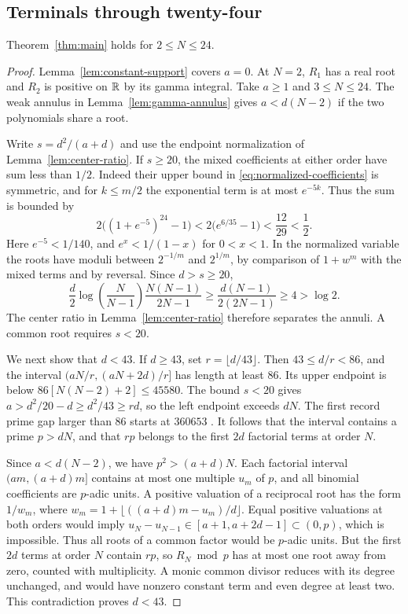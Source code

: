\subsection{Terminals through twenty-four}

\begin{proposition}
\label{prop:small-terminals}
Theorem~\ref{thm:main} holds for \(2\le N\le24\).
\end{proposition}
\begin{proof}
Lemma~\ref{lem:constant-support} covers \(a=0\). At \(N=2\), \(R_1\)
has a real root and \(R_2\) is positive on \(\mathbb R\) by its gamma integral.
Take \(a\ge1\) and \(3\le N\le24\). The weak annulus in
Lemma~\ref{lem:gamma-annulus} gives \(a<d(N-2)\) if the two polynomials
share a root.

Write \(s=d^2/(a+d)\) and use the endpoint normalization
of Lemma~\ref{lem:center-ratio}. If \(s\ge20\), the mixed
coefficients at either order have sum less than \(1/2\).
Indeed their upper bound in \eqref{eq:normalized-coefficients}
is symmetric, and for \(k\le m/2\) the exponential term is
at most \(e^{-5k}\). Thus the sum is bounded by
\[
 2\bigl((1+e^{-5})^{24}-1\bigr)
 <2\bigl(e^{6/35}-1\bigr)<\frac{12}{29}<\frac12.
\]
Here \(e^{-5}<1/140\), and \(e^x<1/(1-x)\) for \(0<x<1\).
In the normalized variable the roots have moduli between
\(2^{-1/m}\) and \(2^{1/m}\), by comparison of \(1+w^m\)
with the mixed terms and by reversal. Since \(d>s\ge20\),
\[
 \frac d2\log\!\left(\frac{N}{N-1}\right)
 \frac{N(N-1)}{2N-1}
 \ge \frac{d(N-1)}{2(2N-1)}\ge 4>\log 2 .
\]
The center ratio in Lemma~\ref{lem:center-ratio} therefore
separates the annuli. A common root requires \(s<20\).

We next show that \(d<43\). If \(d\ge43\), set
\(r=\lfloor d/43\rfloor\). Then \(43\le d/r<86\), and the interval
\((aN/r,(aN+2d)/r]\) has length at least \(86\). Its upper endpoint
is below \(86[N(N-2)+2]\le45580\).
The bound \(s<20\) gives \(a>d^2/20-d\ge d^2/43\ge rd\), so the
left endpoint exceeds \(dN\). The first record prime gap larger
than \(86\) starts at \(360653\) \cite[Table~8]{oliveira-gaps}.
It follows that the interval contains a prime \(p>dN\), and that
\(rp\) belongs to the first \(2d\) factorial terms at order \(N\).

Since \(a<d(N-2)\), we have \(p^2>(a+d)N\).
Each factorial interval \((am,(a+d)m]\) contains at most one
multiple \(u_m\) of \(p\), and all binomial coefficients are
\(p\)-adic units. A positive valuation of a reciprocal root
has the form \(1/w_m\), where
\(w_m=1+\lfloor((a+d)m-u_m)/d\rfloor\).
Equal positive valuations at both orders would imply
\(u_N-u_{N-1}\in[a+1,a+2d-1]\subset(0,p)\), which is impossible.
Thus all roots of a common factor would be \(p\)-adic units.
But the first \(2d\) terms at order \(N\) contain \(rp\), so
\(R_N\bmod p\) has at most one root away from zero, counted with
multiplicity. A monic common divisor reduces with its degree
unchanged, and would have nonzero constant term and even degree
at least two. This contradiction proves \(d<43\).


\end{proof}

